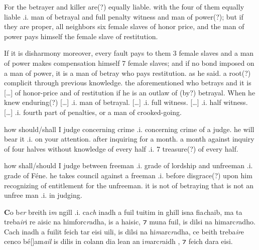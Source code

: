 \documentclass[11pt]{article}
\begin{document}
\begin{pages}
\begin{Rightside}
   \pstart
    For the betrayer and killer are(?) equally liable. with the four of them equally liable .i. man of betrayal and full penalty witness and man of power(?); but if they are proper, all neighbors six female slaves of honor price, and the man of power pays himself the female slave of restitution. 
   \pend
   
   \pstart
    If it is disharmony moreover, every fault pays to them 3 female slaves and a man of power makes compensation himself 7 female slaves; and if no bond imposed on a man of power, it is a man of betray who pays restitution. as he said. a root(?) complicit through previous knowledge. the aforementioned who betrays and it is [\ldots] of honor-price and of restitution if he is an outlaw of (by?) betrayal. When he knew enduring(?) [\ldots] .i. man of betrayal. [\ldots] .i. full witness. [\ldots] .i. half witness. [\ldots] .i. fourth part of penalties, or a man of crooked-going.  
   \pend

   \pstart
   how should/shall I judge concerning crime .i. concerning crime of a judge.  he will bear it .i. on your attention. after inquiring for a month. a month against inquiry of four halves without knowledge of every half .i. 7 treasure(?) of every half.  
   \pend

   \pstart
   how shall/should I judge between freeman .i. grade of lordship and unfreeman .i. grade of F\'{e}ne. he takes council against a freeman .i. before disgrace(?) upon him recognizing of entitlement for the unfreeman. it is not of betraying that is not an unfree man .i. in judging.
   \pend
    \endnumbering
  \end{Rightside}
  \Pages

\begin{Leftside}
    \beginnumbering
    \pstart
    \textbf{C}o b\emph{er} breith i\emph{m}  ngill .i. ca\emph{ch} inadh a fuil tuitim in ghill isna fia\emph{c}haib, ma ta treba\emph{ir}i re aisic na himforc\emph{r}adha, is a haisic, ⁊ muna fuil, is dilsi na himarc\emph{r}adho. Cach inadh  a fuilit feich tar eisi uili, is dilsi na hi\emph{m}arc\emph{r}adha, ce beith treba\emph{ir}e cenco b\'{e}[\hspace{2mm}]am\emph{ail} is dilis in colann dia lean an i\emph{m}arc\emph{r}aidh , ⁊ feich dara eisi. 
    \pend


\end{Leftside}
\end{pages}
\end{document}
